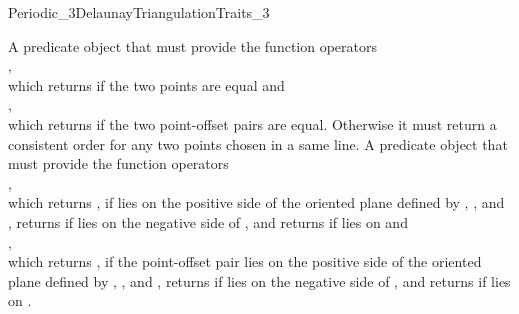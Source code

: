 \begin{ccRefConcept}{Periodic_3DelaunayTriangulationTraits_3}

{A predicate object that must provide the function operators\\ 
,\\
which returns  if the two points are equal and\\
,\\
which returns  if the two point-offset pairs are equal.
Otherwise it must return a consistent order for any two points chosen
in a same line.
}
\ccGlue
{}
{A predicate object that must provide the function operators\\
,\\
which returns , if  lies on the positive side of
the oriented plane  defined by , , and ,
returns  if  lies on the negative side of
, and returns  if  lies on  and\\
,\\
which returns , if the point-offset pair 
lies on the positive side of the oriented plane  defined by
, , and , 
returns  if  lies on the negative side of
, and returns  if  lies on .
}


\end{ccRefConcept}
